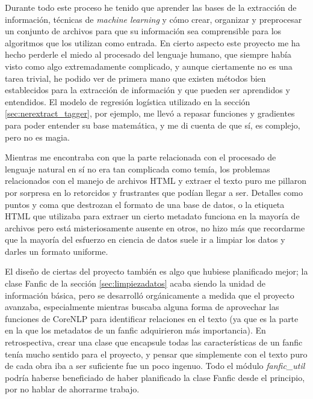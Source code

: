 \documentclass{pre-tfg}
\begin{document}
Durante todo este proceso he tenido que aprender las bases de la extracción de información, técnicas de \textit{machine learning} y cómo crear, organizar y preprocesar un conjunto de archivos para que su información sea comprensible para los algoritmos que los utilizan como entrada. En cierto aspecto este proyecto me ha hecho perderle el miedo al procesado del lenguaje humano, que siempre había visto como algo extremadamente complicado, y aunque ciertamente no es una tarea trivial, he podido ver de primera mano que existen métodos bien establecidos para la extracción de información y que pueden ser aprendidos y entendidos. El modelo de regresión logística utilizado en la sección \ref{sec:nerextract_tagger}, por ejemplo, me llevó a repasar funciones y gradientes para poder entender su base matemática, y me di cuenta de que sí, es complejo, pero no es magia.

Mientras me encontraba con que la parte relacionada con el procesado de lenguaje natural en sí no era tan complicada como temía, los problemas relacionados con el manejo de archivos HTML y extraer el texto puro me pillaron por sorpresa en lo retorcidos y frustrantes que podían llegar a ser. Detalles como puntos y coma que destrozan el formato de una base de datos, o la etiqueta HTML que utilizaba para extraer un cierto metadato funciona en la mayoría de archivos pero está misteriosamente ausente en otros, no hizo más que recordarme que la mayoría del esfuerzo en ciencia de datos suele ir a limpiar los datos y darles un formato uniforme.

El diseño de ciertas del proyecto también es algo que hubiese planificado mejor; la clase Fanfic de la sección \ref{sec:limpiezadatos} acaba siendo la unidad de información básica, pero se desarrolló orgánicamente a medida que el proyecto avanzaba, especialmente mientras buscaba alguna forma de aprovechar las funciones de CoreNLP para identificar relaciones en el texto (ya que es la parte en la que los metadatos de un fanfic adquirieron más importancia). En retrospectiva, crear una clase que encapsule todas las características de un fanfic tenía mucho sentido para el proyecto, y pensar que simplemente con el texto puro de cada obra iba a ser suficiente fue un poco ingenuo. Todo el módulo \textit{fanfic\_util} podría haberse beneficiado de haber planificado la clase Fanfic desde el principio, por no hablar de ahorrarme trabajo.
\end{document}
